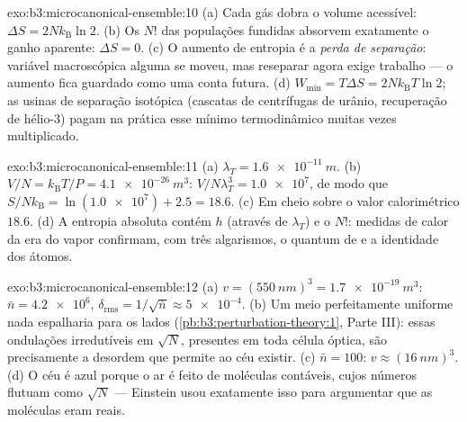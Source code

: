 \begin{solution}{exo:b3:microcanonical-ensemble:10}
(a) Cada gás dobra o volume acessível: $\Delta S =
2Nk_{\text{B}}\ln2$. (b) Os $N!$ das populações fundidas absorvem
exatamente o ganho aparente: $\Delta S = 0$. (c) O aumento de entropia
é a \emph{perda de separação}: variável macroscópica alguma se moveu,
mas reseparar agora exige trabalho --- o aumento fica guardado como uma
conta futura. (d) $W_{\min} = T\Delta S =
2Nk_{\text{B}}T\ln2$; as usinas de separação isotópica (cascatas de
centrífugas de urânio, recuperação de hélio-3) pagam na prática esse
mínimo termodinâmico muitas vezes multiplicado.
\end{solution}

\begin{solution}{exo:b3:microcanonical-ensemble:11}
(a) $\lambda_T = \qty{1.6e-11}{m}$. (b) $V/N = k_{\text{B}}T/P =
\qty{4.1e-26}{m^3}$: $V/N\lambda_T^3 = \num{1.0e7}$, de modo que
$S/Nk_{\text{B}} = \ln(\num{1.0e7}) + 2.5 = 18.6$. (c) Em cheio sobre
o valor calorimétrico $18.6$. (d) A entropia absoluta contém $h$
(através de $\lambda_T$) e o $N!$: medidas de calor da era do vapor
confirmam, com três algarismos, o quantum de  e a identidade dos
átomos.
\end{solution}

\begin{solution}{exo:b3:microcanonical-ensemble:12}
(a) $v = (\qty{550}{nm})^3 = \qty{1.7e-19}{m^3}$: $\bar n =
\num{4.2e6}$, $\delta_{\text{rms}} = 1/\sqrt{\bar n} \approx
\num{5e-4}$. (b) Um meio perfeitamente uniforme nada espalharia para os
lados (\cref{pb:b3:perturbation-theory:1}, Parte III): essas
ondulações irredutíveis em $\sqrt N$, presentes em toda célula óptica,
são precisamente a desordem que permite ao céu existir. (c)
$\bar n = 100$: $v
\approx (\qty{16}{nm})^3$. (d) O céu é azul porque o
ar é feito de moléculas contáveis, cujos números flutuam como $\sqrt N$
--- Einstein usou exatamente isso para argumentar que as moléculas
eram reais.
\end{solution}

